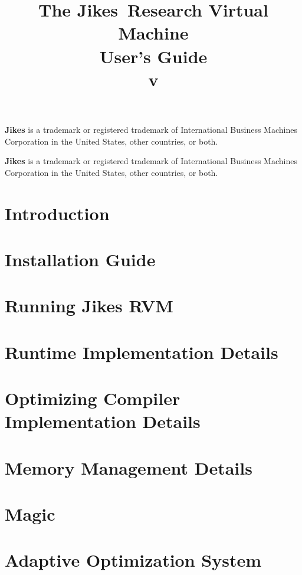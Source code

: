 \documentclass{article}
\title{\texonly{\vfill} {\huge The Jikes\JikesTMFootnote\ Research Virtual
Machine
\\
User's Guide} \\ {\huge v\version} \\ { } \texonly{\vfill} }
\newcommand{\JikesTMFooter}{\W \hline \small {\bf Jikes} is a
trademark or registered trademark of International Business Machines
Corporation in the United States, other countries, or both.}
\newcommand{\jrvm}{Jikes RVM}
\begin{document}
\maketitle
\date{}

\T \JikesTMFooter

\T \newpage
\label{hlxtoc}
\T \tableofcontents
\T \listoffigures
\W {}

\W \JikesTMFooter

\T \newpage
\section{Introduction}


\T \newpage
\section{Installation Guide} \label{section:installation}


\T \newpage
\section{Running \jrvm} \label{section:running}


\T \newpage
\section{Runtime Implementation Details}


\T \newpage
\section{Optimizing Compiler Implementation Details}
\label{section:optdetails}


\T \newpage
\section{Memory Management Details}


\T \newpage
\section{Magic}


\T \newpage
\section{Adaptive Optimization System}
\label{section:aosdetails}

\end{document}
